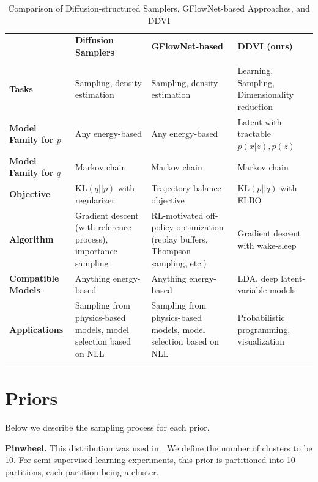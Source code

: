 \documentclass[letterpaper]{article} %
\newcommand\KL{\text{KL}}
\begin{document}
\begin{table}[ht]
\centering
\begin{tabular}{@{}p{2cm}p{4cm}p{4cm}p{4cm}@{}}
\toprule
                        & \textbf{Diffusion Samplers} & \textbf{GFlowNet-based} & \textbf{DDVI (ours)} \\ 
                        & \cite{berner2022optimal, zhang2021path, vargas2023denoising, akhound2024iterated}              & \cite{zhang2023diffusion, richter2023improved, sendera2024diffusion, malkin2022trajectory}               &             \\ \midrule
\textbf{Tasks}                   & Sampling, density estimation  & Sampling, density estimation  & Learning, Sampling, Dimensionality reduction \\
\textbf{Model Family for $p$}    & Any energy-based              & Any energy-based              & Latent with tractable $p(x|z), p(z)$ \\
\textbf{Model Family for $q$}    & Markov chain                  & Markov chain                  & Markov chain \\
\textbf{Objective}  & $\KL(q||p)$ with regularizer & Trajectory balance objective & $\KL(p||q)$ with ELBO \\
\textbf{Algorithm}  & Gradient descent (with reference process), importance sampling & RL-motivated off-policy optimization (replay buffers, Thompson sampling, etc.) & Gradient descent with wake-sleep \\
\textbf{Compatible Models} & Anything energy-based  & Anything energy-based  & LDA, deep latent-variable models \\
\textbf{Applications}            & Sampling from physics-based models, model selection based on NLL & Sampling from physics-based models, model selection based on NLL & Probabilistic programming, visualization \\ \bottomrule
\end{tabular}
\caption{Comparison of Diffusion-structured Samplers, GFlowNet-based Approaches, and DDVI}
\label{tab:comparison}
\end{table}

\section{Priors}
\label{app:priors}

Below we describe the sampling process for each prior. 

\textbf{Pinwheel.} This distribution was used in \citep{johnson2016svae}. We define the number of clusters to be 10. For semi-supervised learning experiments, this prior is partitioned into 10 partitions, each partition being a cluster.
\end{document}
